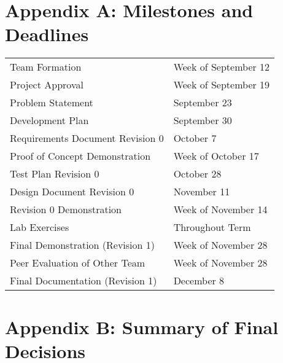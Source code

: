 \documentclass[11pt]{meetingmins}
\begin{document}
\newpage
\section{Appendix A: Milestones and Deadlines}
\begin{tabular}{ p{6.7cm} l}

  Team Formation & Week of September 12\\

  Project Approval & Week of September 19\\

  Problem Statement & September 23\\

  Development Plan & September 30\\

  Requirements Document Revision 0 & October 7\\

  Proof of Concept Demonstration & Week of October 17\\

  Test Plan Revision 0 & October 28\\

  Design Document Revision 0 & November 11\\

  Revision 0 Demonstration & Week of November 14\\

  Lab Exercises & Throughout Term\\

  Final Demonstration (Revision 1) & Week of November 28\\

  Peer Evaluation of Other Team & Week of November 28\\

  Final Documentation (Revision 1) & December 8\\

\end{tabular}

\newpage
\section{Appendix B: Summary of Final Decisions}
\end{document}
